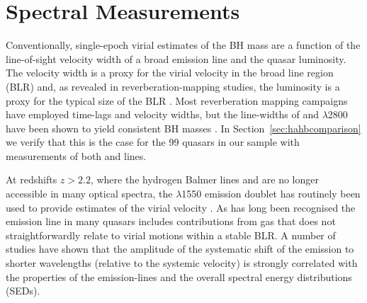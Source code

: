 \section{Spectral Measurements}

Conventionally, single-epoch virial estimates of the BH mass are a function of the line-of-sight velocity width of a broad emission line and the quasar luminosity. 
The velocity width is a proxy for the virial velocity in the broad line region (BLR) and, as revealed in reverberation-mapping studies, the luminosity is a proxy for the typical size of the BLR \citep[the $R-L$ relation; e.g.][]{kaspi00,kaspi07}. 
Most reverberation mapping campaigns have employed \hb time-lags and velocity widths, but the line-widths of \ha and $\lambda$2800 have been shown to yield consistent BH masses \citep[e.g.][]{mclure02,greene05,onken08,shen08,wang09,rafiee11,mejia-restrepo16}. 
In Section~\ref{sec:hahbcomparison} we verify that this is the case for the 99 quasars in our sample with measurements of both \ha and \hb lines.     

At redshifts $z> 2.2$, where the hydrogen Balmer lines and  are no longer accessible in many optical spectra, the $\lambda$1550 emission doublet has routinely been used to provide estimates of the virial velocity \citep[e.g.][]{shen11}. 
As has long been recognised \citep{gaskell82, tytler92} the  emission line in many quasars includes contributions from gas that does not straightforwardly relate to virial motions within a stable BLR.
A number of studies \citep[e.g.][]{shen08, richards11} have shown that the amplitude of the systematic shift of the  emission to shorter wavelengths (relative to the systemic velocity) is strongly correlated with the properties of the emission-lines and the overall spectral energy distributions (SEDs). 

